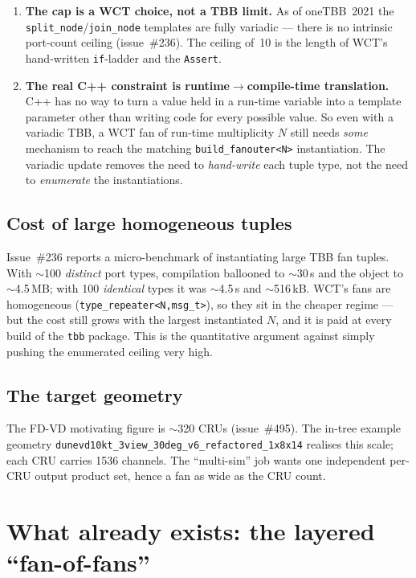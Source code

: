 \documentclass[11pt]{article}
\newcommand{\code}[1]{\texttt{#1}}
\newcommand{\file}[1]{\texttt{\small #1}}
\begin{document}
\begin{enumerate}
\item \textbf{The cap is a WCT choice, not a TBB limit.}  As of oneTBB~2021 the
  \code{split\_node}/\code{join\_node} templates are fully variadic --- there is
  no intrinsic port-count ceiling (issue~\#236).  The ceiling of~10 is the length
  of WCT's hand-written \code{if}-ladder and the \code{Assert}.
\item \textbf{The real C++ constraint is runtime$\to$compile-time translation.}
  C++ has no way to turn a value held in a run-time variable into a template
  parameter other than writing code for every possible value.  So even with a
  variadic TBB, a WCT fan of run-time multiplicity $N$ still needs \emph{some}
  mechanism to reach the matching \code{build\_fanouter<N>} instantiation.  The
  variadic update removes the need to \emph{hand-write} each tuple type, not the
  need to \emph{enumerate} the instantiations.
\end{enumerate}

\subsection{Cost of large homogeneous tuples}

Issue~\#236 reports a micro-benchmark of instantiating large TBB fan tuples.
With $\sim$100 \emph{distinct} port types, compilation ballooned to
$\sim$30\,s and the object to $\sim$4.5\,MB; with 100 \emph{identical} types it
was $\sim$4.5\,s and $\sim$516\,kB.  WCT's fans are homogeneous
(\code{type\_repeater<N,msg\_t>}), so they sit in the cheaper regime --- but the
cost still grows with the largest instantiated $N$, and it is paid at every build
of the \code{tbb} package.  This is the quantitative argument against simply
pushing the enumerated ceiling very high.

\subsection{The target geometry}

The FD-VD motivating figure is $\sim$320 CRUs (issue~\#495).  The in-tree
example geometry \file{dunevd10kt\_3view\_30deg\_v6\_refactored\_1x8x14} realises
this scale; each CRU carries 1536 channels.  The ``multi-sim'' job wants one
independent per-CRU output product set, hence a fan as wide as the CRU count.

\section{What already exists: the layered ``fan-of-fans''}
\label{sec:existing}
\end{document}
